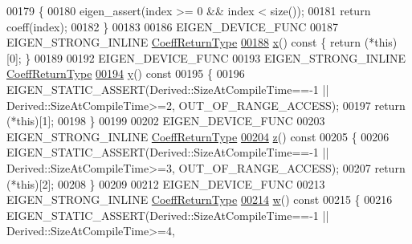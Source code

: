 \begin{DoxyCode}
00179 \textcolor{keyword}{    }\{
00180       eigen\_assert(index >= 0 && index < size());
00181       \textcolor{keywordflow}{return} coeff(index);
00182     \}
00183 
00186     EIGEN\_DEVICE\_FUNC
00187     EIGEN\_STRONG\_INLINE \hyperlink{class_eigen_1_1internal_1_1_tensor_lazy_evaluator_writable}{CoeffReturnType}
\hyperlink{group___core___module_a36fb246141b6ea5ab5289d7eb6afdf6e}{00188}     \hyperlink{group___core___module_a36fb246141b6ea5ab5289d7eb6afdf6e}{x}()\textcolor{keyword}{ const }\{ \textcolor{keywordflow}{return} (*\textcolor{keyword}{this})[0]; \}
00189 
00192     EIGEN\_DEVICE\_FUNC
00193     EIGEN\_STRONG\_INLINE \hyperlink{class_eigen_1_1internal_1_1_tensor_lazy_evaluator_writable}{CoeffReturnType}
\hyperlink{group___core___module_af2cb257225cf4348136a37fa9333ccda}{00194}     \hyperlink{group___core___module_af2cb257225cf4348136a37fa9333ccda}{y}()\textcolor{keyword}{ const}
00195 \textcolor{keyword}{    }\{
00196       EIGEN\_STATIC\_ASSERT(Derived::SizeAtCompileTime==-1 || Derived::SizeAtCompileTime>=2, 
      OUT\_OF\_RANGE\_ACCESS);
00197       \textcolor{keywordflow}{return} (*\textcolor{keyword}{this})[1];
00198     \}
00199 
00202     EIGEN\_DEVICE\_FUNC
00203     EIGEN\_STRONG\_INLINE \hyperlink{class_eigen_1_1internal_1_1_tensor_lazy_evaluator_writable}{CoeffReturnType}
\hyperlink{group___core___module_a9040af2dcad8961168daafe09c1b1dc4}{00204}     \hyperlink{group___core___module_a9040af2dcad8961168daafe09c1b1dc4}{z}()\textcolor{keyword}{ const}
00205 \textcolor{keyword}{    }\{
00206       EIGEN\_STATIC\_ASSERT(Derived::SizeAtCompileTime==-1 || Derived::SizeAtCompileTime>=3, 
      OUT\_OF\_RANGE\_ACCESS);
00207       \textcolor{keywordflow}{return} (*\textcolor{keyword}{this})[2];
00208     \}
00209 
00212     EIGEN\_DEVICE\_FUNC
00213     EIGEN\_STRONG\_INLINE \hyperlink{class_eigen_1_1internal_1_1_tensor_lazy_evaluator_writable}{CoeffReturnType}
\hyperlink{group___core___module_a422892fbb6b2eecce243776c3b8452ab}{00214}     \hyperlink{group___core___module_a422892fbb6b2eecce243776c3b8452ab}{w}()\textcolor{keyword}{ const}
00215 \textcolor{keyword}{    }\{
00216       EIGEN\_STATIC\_ASSERT(Derived::SizeAtCompileTime==-1 || Derived::SizeAtCompileTime>=4, 

\end{DoxyCode}
